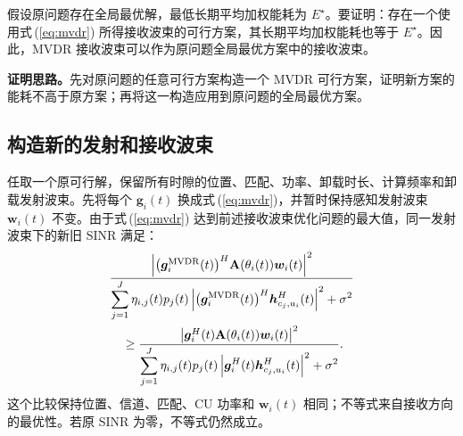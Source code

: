 \documentclass[11pt,a4paper]{ctexart}
\begin{document}
假设原问题存在全局最优解，最低长期平均加权能耗为 $E^\star$。要证明：存在一个使用式\,(\ref{eq:mvdr}) 所得接收波束的可行方案，其长期平均加权能耗也等于 $E^\star$。因此，MVDR 接收波束可以作为原问题全局最优方案中的接收波束。

\noindent\textbf{证明思路。}先对原问题的任意可行方案构造一个 MVDR 可行方案，证明新方案的能耗不高于原方案；再将这一构造应用到原问题的全局最优方案。

\subsection{构造新的发射和接收波束}
任取一个原可行解，保留所有时隙的位置、匹配、功率、卸载时长、计算频率和卸载发射波束。先将每个 $\bm g_i(t)$ 换成式\,(\ref{eq:mvdr})，并暂时保持感知发射波束 $\bm w_i(t)$ 不变。由于式\,(\ref{eq:mvdr}) 达到前述接收波束优化问题的最大值，同一发射波束下的新旧 SINR 满足：
\begin{align}\label{eq:sinr-domination}
&\frac{\left|\bigl(\bm g_i^{\rm MVDR}(t)\bigr)^H
\mathbf A(\theta_i(t))\bm w_i(t)\right|^2}
{\displaystyle\sum_{j=1}^J\eta_{i,j}(t)p_j(t)
\left|\bigl(\bm g_i^{\rm MVDR}(t)\bigr)^H\bm h_{c_j,u_i}^{H}(t)\right|^2+\sigma^2}\notag\\
&\quad\ge\frac{\left|\bm g_i^H(t)\mathbf A(\theta_i(t))\bm w_i(t)\right|^2}
{\displaystyle\sum_{j=1}^J\eta_{i,j}(t)p_j(t)
\left|\bm g_i^H(t)\bm h_{c_j,u_i}^{H}(t)\right|^2+\sigma^2}.
\end{align}
这个比较保持位置、信道、匹配、CU 功率和 $\bm w_i(t)$ 相同；不等式来自接收方向的最优性。若原 SINR 为零，不等式仍然成立。
\end{document}
